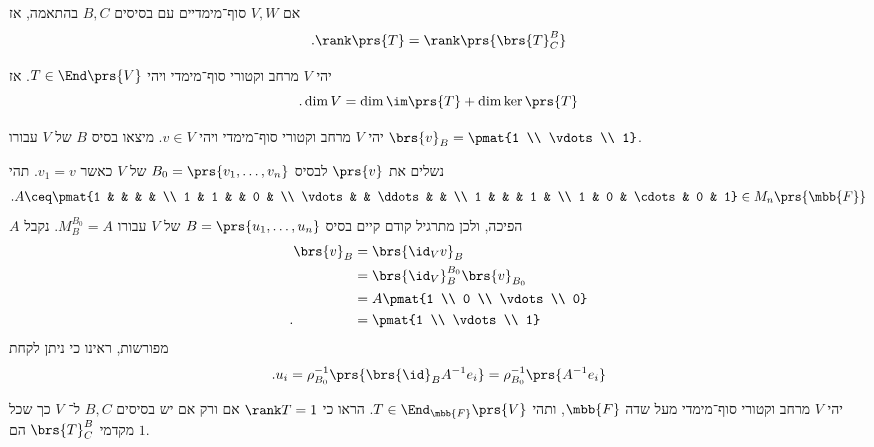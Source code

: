 \documentclass[a4paper,10pt,twoside,openany]{book}
\begin{document}
\begin{remark}
אם
$V,W$
סוף־מימדיים עם בסיסים
$B,C$
בהתאמה, אז
\[\text{.} \rank\prs{T} = \rank\prs{\brs{T}^B_C}\]
\end{remark}

\begin{theorem}
יהי
$V$
מרחב וקטורי סוף־מימדי ויהי
$T \in \End\prs{V}$.
אז
\[\text{.} \dim V = \dim \im\prs{T} + \dim \ker\prs{T}\]
\end{theorem}

\begin{exercisechap}
יהי
$V$
מרחב וקטורי סוף־מימדי ויהי
$v \in V$.
מיצאו בסיס
$B$
של
$V$
עבורו
$\brs{v}_B = \pmat{1 \\ \vdots \\ 1}$.
\end{exercisechap}

\begin{solution}
נשלים את
$\prs{v}$
לבסיס
$B_0 = \prs{v_1, \ldots, v_n}$
של
$V$
כאשר
$v_1 = v$.
תהי
\begin{align*}
\text{.} A \ceq \pmat{1 & & & & \\
1 & 1 & & 0 & \\
\vdots & & \ddots & & \\
1 & & & 1 & \\
1 & 0 & \cdots & 0 & 1} \in M_n\prs{\mbb{F}}
\end{align*}
$A$
הפיכה, ולכן מתרגיל קודם קיים בסיס
$B = \prs{u_1, \ldots, u_n}$
של
$V$
עבורו
$M^{B_0}_B = A$.
נקבל
\begin{align*}
\brs{v}_B &= \brs{\id_V v}_B
\\&=
\brs{\id_V}^{B_0}_{B} \brs{v}_{B_0}
\\&= A \pmat{1 \\ 0 \\ \vdots \\ 0}
\\ \text{.} \hphantom{\brs{v}_B} &= \pmat{1 \\ \vdots \\ 1}
\end{align*}
מפורשות, ראינו כי ניתן לקחת
\[\text{.} u_i = \rho_{B_0}^{-1}\prs{\brs{\id}_B A^{-1} e_i} = \rho_{B_0}^{-1}\prs{A^{-1}e_i}\]
\end{solution}

\begin{exercisechap}
יהי
$V$
מרחב וקטורי סוף־מימדי מעל שדה
$\mbb{F}$,
ותהי
$T \in \End_{\mbb{F}}\prs{V}$.
הראו כי
$\rank T = 1$
אם ורק אם יש בסיסים
$B,C$
ל־%
$V$
כך שכל מקדמי
$\brs{T}^B_C$
הם
$1$.
\end{exercisechap}
\end{document}
